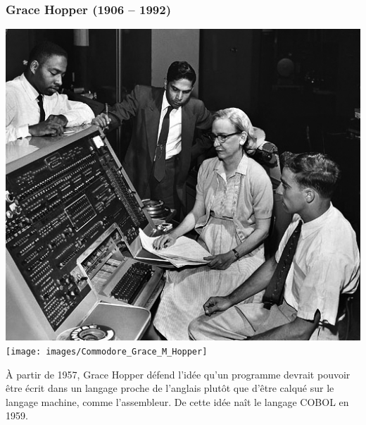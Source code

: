 \documentclass[utf8,10pt]{beamer}
\begin{document}
\begin{frame}
	\frametitle{Grace Hopper (1906 -- 1992)}
	
	\hfill 
	\includegraphics{images/Grace_Hopper_and_UNIVAC}
	\hfill
	\texttt{[image: images/Commodore\_Grace\_M\_Hopper]}
	\hfill \\
	
	\begin{block}{}
        À partir de 1957, Grace Hopper défend l'idée qu'un programme devrait pouvoir être écrit dans un langage proche de l'anglais plutôt que d'être calqué sur le langage machine, comme l'assembleur. De cette idée naît le langage COBOL en 1959.
    \end{block}
    
    \begin{flushright}
        \hyperlink{http://fr.wikipedia.org/wiki/Grace_Hopper}%
            {}
    \end{flushright}

\end{frame}
\end{document}
